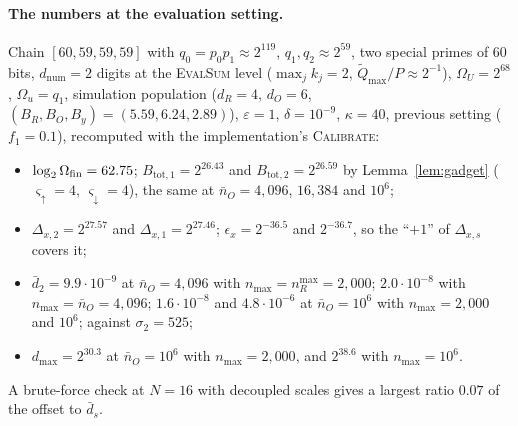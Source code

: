 \paragraph{The numbers at the evaluation setting.} Chain $[60,59,59,59]$ with $q_0=p_0p_1\approx2^{119}$, $q_1,q_2\approx2^{59}$, two special primes of $60$ bits, $d_{\mathrm{num}}=2$ digits at the \textsc{EvalSum} level ($\max_jk_j=2$, $\tilde Q_{\max}/P\approx2^{-1}$), $\Omega_U=2^{68}$, $\Omega_u=q_1$, simulation population ($d_R=4$, $d_O=6$, $(B_R,B_O,B_y)=(5.59,6.24,2.89)$), $\varepsilon=1$, $\delta=10^{-9}$, $\kappa=40$, previous setting ($f_1=0.1$), recomputed with the implementation's \textsc{Calibrate}:
\begin{itemize}[nosep]
  \item $\log_2\Omega_{\mathrm{fin}}=62.75$; $B_{\mathrm{tot},1}=2^{26.43}$ and $B_{\mathrm{tot},2}=2^{26.59}$ by Lemma~\ref{lem:gadget} ($\varsigma_\uparrow=4$, $\varsigma_\downarrow=4$), the same at $\bar n_O=4{,}096$, $16{,}384$ and $10^6$;
  \item $\Delta_{x,2}=2^{27.57}$ and $\Delta_{x,1}=2^{27.46}$; $\epsilon_x=2^{-36.5}$ and $2^{-36.7}$, so the ``$+1$'' of $\Delta_{x,s}$ covers it;
  \item $\bar d_2=9.9\cdot10^{-9}$ at $\bar n_O=4{,}096$ with $n_{\max}=n_R^{\max}=2{,}000$; $2.0\cdot10^{-8}$ with $n_{\max}=\bar n_O=4{,}096$; $1.6\cdot10^{-8}$ and $4.8\cdot10^{-6}$ at $\bar n_O=10^6$ with $n_{\max}=2{,}000$ and $10^6$; against $\sigma_2=525$;
  \item $d_{\max}=2^{30.3}$ at $\bar n_O=10^6$ with $n_{\max}=2{,}000$, and $2^{38.6}$ with $n_{\max}=10^6$.
\end{itemize}
A brute-force check at $N=16$ with decoupled scales gives a largest ratio $0.07$ of the offset to $\bar d_s$.
